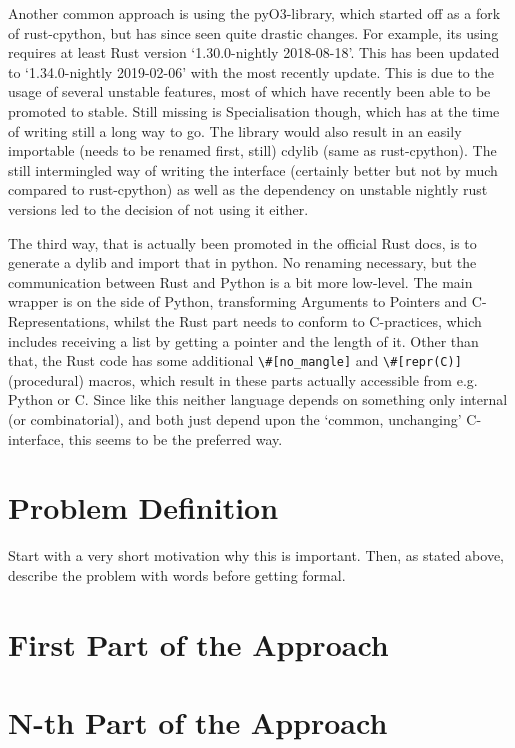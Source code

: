 Another common approach is using the pyO3-library, which started off as a fork of rust-cpython, but has since seen quite drastic changes. For example, its using requires at least Rust version ‘1.30.0-nightly 2018-08-18’. 
This has been updated to ‘1.34.0-nightly 2019-02-06’ with the most recently update. This is due to the usage of several unstable features, most of which have recently been able to be promoted to stable. Still missing is Specialisation though, which has at the time of writing still a long way to go. The library would also result in an easily importable (needs to be renamed first, still) cdylib (same as rust-cpython). The still intermingled way of writing the interface (certainly better but not by much compared to rust-cpython) as well as the dependency on unstable nightly rust versions led to the decision of not using it either.

The third way, that is actually been promoted in the official Rust docs, is to
generate a dylib and import that in python. No renaming necessary, but the
communication between Rust and Python is a bit more low-level. The main wrapper
is on the side of Python, transforming Arguments to Pointers and
C-Representations, whilst the Rust part needs to conform to C-practices, which
includes receiving a list by getting a pointer and the length of it. Other than
that, the Rust code has some additional \verb!\#[no_mangle]! and \verb!\#[repr(C)]!
(procedural) macros, which result in these parts actually accessible from e.g.
Python or C. Since like this neither language depends on something only
internal (or combinatorial), and both just depend upon the ‘common, unchanging’
C-interface, this seems to be the preferred way.




\section{Problem Definition}
Start with a very short motivation why this is important. Then, as stated above, describe the problem with words before getting formal.

\section{First Part of the Approach}

\section{N-th Part of the Approach}



